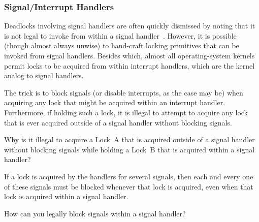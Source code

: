 \subsubsection{Signal/Interrupt Handlers}
\label{sec:locking:Signal/Interrupt Handlers}

Deadlocks involving signal handlers are often quickly dismissed by
noting that it is not legal to invoke  from
within a signal handler~\cite{OpenGroup1997pthreads}.
However, it is possible (though almost always unwise) to hand-craft
locking primitives that can be invoked from signal handlers.
Besides which, almost all operating-system kernels permit locks to
be acquired from within interrupt handlers, which are the kernel analog
to signal handlers.

The trick is to block signals (or disable interrupts, as the case may be)
when acquiring any lock that might be acquired within an interrupt
handler.
Furthermore, if holding such a lock, it is illegal to attempt to
acquire any lock that is ever acquired
outside of a signal handler without blocking signals.

\QuickQuiz{}
	Why is it illegal to acquire a Lock~A that is acquired outside
	of a signal handler without blocking signals while holding
	a Lock~B that is acquired within a signal handler?
 \QuickQuizEnd

If a lock is acquired by the handlers for several signals, then each
and every one of these signals must be blocked whenever that lock is
acquired, even when that
lock is acquired within a signal handler.

\QuickQuiz{}
	How can you legally block signals within a signal handler?
 \QuickQuizEnd

